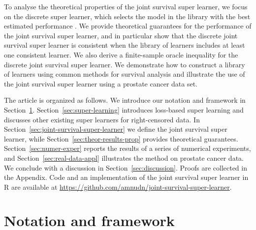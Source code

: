 \documentclass[alpha-refs]{wiley-article}
\newcommand{\1}{\mathds{1}}
\begin{document}
To analyse the theoretical properties of the joint survival super
learner, we focus on the discrete super learner, which selects the
model in the library with the best estimated performance
\citep{van2007super}. We provide theoretical guarantees for the
performance of the joint survival super learner, and in particular
show that the discrete joint survival super learner is consistent
when the library of learners includes at least one consistent
learner. We also derive a finite-sample oracle inequality for the
discrete joint survival super learner. We demonstrate how to construct
a library of learners using common methods for survival analysis and
illustrate the use of the joint survival super learner using a
prostate cancer data set.

The article is organized as follows. We introduce our notation and
framework in Section~\ref{sec:framework}.
Section~\ref{sec:super-learning} introduces loss-based super learning
and discusses other existing super learners for right-censored
data. In Section~\ref{sec:joint-survival-super-learner} we define the joint
survival super learner, while Section~\ref{sec:theor-results-prop}
provides theoretical guarantees. Section~\ref{sec:numer-exper} reports
the results of a series of numerical experiments, and
Section~\ref{sec:real-data-appl} illustrates the method on prostate
cancer data. We conclude with a discussion in
Section~\ref{sec:discussion}. Proofs are collected in the
Appendix. Code and an implementation of the joint survival super
learner in R \citep{R} are available at
\url{https://github.com/amnudn/joint-survival-super-learner}.

\section{Notation and framework}
\label{sec:framework}
\end{document}
